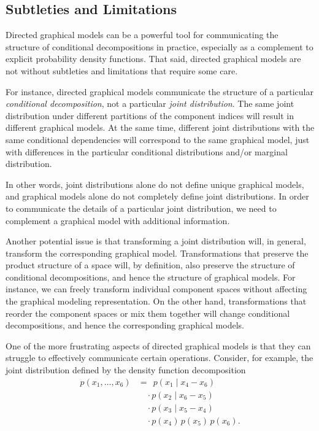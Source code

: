 \documentclass[
  letterpaper,
  DIV=11,
  numbers=noendperiod]{scrartcl}
\begin{document}
\subsection{Subtleties and
Limitations}\label{subtleties-and-limitations}

Directed graphical models can be a powerful tool for communicating the
structure of conditional decompositions in practice, especially as a
complement to explicit probability density functions. That said,
directed graphical models are not without subtleties and limitations
that require some care.

For instance, directed graphical models communicate the structure of a
particular \emph{conditional decomposition}, not a particular
\emph{joint distribution}. The same joint distribution under different
partitions of the component indices will result in different graphical
models. At the same time, different joint distributions with the same
conditional dependencies will correspond to the same graphical model,
just with differences in the particular conditional distributions and/or
marginal distribution.

In other words, joint distributions alone do not define unique graphical
models, and graphical models alone do not completely define joint
distributions. In order to communicate the details of a particular joint
distribution, we need to complement a graphical model with additional
information.

Another potential issue is that transforming a joint distribution will,
in general, transform the corresponding graphical model. Transformations
that preserve the product structure of a space will, by definition, also
preserve the structure of conditional decompositions, and hence the
structure of graphical models. For instance, we can freely transform
individual component spaces without affecting the graphical modeling
representation. On the other hand, transformations that reorder the
component spaces or mix them together will change conditional
decompositions, and hence the corresponding graphical models.

One of the more frustrating aspects of directed graphical models is that
they can struggle to effectively communicate certain operations.
Consider, for example, the joint distribution defined by the density
function decomposition \begin{align*}
p( x_{1}, \ldots, x_{6}  )
&= \;\,
p ( x_{1} \mid x_{4} - x_{6} )
\\&\quad \cdot
p ( x_{2} \mid x_{6} - x_{5} )
\\
&\quad \cdot
p ( x_{3} \mid x_{5} - x_{4} )
\\
&\quad \cdot
p ( x_{4} ) \,
p ( x_{5} ) \,
p ( x_{6} ).
\end{align*}
\end{document}

